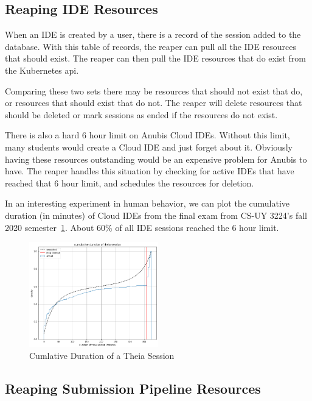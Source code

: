 \subsection{Reaping IDE Resources}\label{subsec:reaping-ide-resources}

When an IDE is created by a user, there is a record of the session added to the database.
With this table of records, the reaper can pull all the IDE resources that should exist.
The reaper can then pull the IDE resources that do exist from the Kubernetes api.

Comparing these two sets there may be resources that should not exist that do, or
resources that should exist that do not.
The reaper will delete resources that should be deleted or mark sessions as ended
if the resources do not exist.

There is also a hard 6 hour limit on Anubis Cloud IDEs.
Without this limit, many students would create a Cloud IDE and just forget about it.
Obviously having these resources outstanding would be an expensive problem for Anubis to have.
The reaper handles this situation by checking for active IDEs that have reached that 6 hour limit,
and schedules the resources for deletion.

In an interesting experiment in human behavior, we can plot the cumulative duration (in minutes) of
Cloud IDEs from the final exam from CS-UY 3224's fall 2020 semester~\ref{fig:theia3}.
About 60\% of all IDE sessions reached the 6 hour limit.

\begin{figure}[ht]
    \centering
    \includegraphics[width=0.5\textwidth]{figures/theia3}
    \caption{Cumlative Duration of a Theia Session\label{fig:theia3}}
\end{figure}

\subsection{Reaping Submission Pipeline Resources}\label{subsec:reaping-submission-pipeline-resources}

